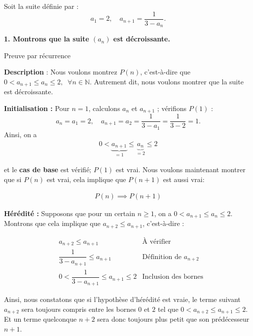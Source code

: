 \documentclass{report}
\begin{document}
Soit la suite définie par :
\[
a_1 = 2, \quad a_{n+1} = \frac{1}{3 - a_n}.
\]

\textbf{1. Montrons que la suite \((a_n)\) est décroissante.}

\vspace{1em}
\begin{center}
    Preuve par récurrence
\end{center}

\textbf{Description} : Nous voulons montrez $P(n)$, c'est-à-dire que 
$0 < a_{n+1} \leq a_n \leq 2, \;\; \forall n \in \mathbb{N}$. Autrement 
dit, nous voulons montrer que la suite est décroissante. 

\vspace{1em}


\textbf{Initialisation :} Pour \( n = 1 \), calculons \( a_n \) et \( a_{n+1} \) ; vérifions $P(1)$ :
\[
    a_n = a_1 = 2, \quad a_{n+1} = a_2 = \frac{1}{3 - a_1} = \frac{1}{3 - 2} = 1.
\]
Ainsi, on a  
\begin{align*}
    0 < \underbrace{a_{n+1}}_{= 1}  \leq \underbrace{a_n}_{= 2} \leq 2 
\end{align*}




et le \textbf{cas de base} est vérifié; $P(1)$ est vrai. Nous voulons maintenant montrer que si $P(n)$ est vrai, 
cela implique que $P(n+1)$ est aussi vrai:

\begin{align*}
    P(n) \implies P(n+1)
\end{align*}


\textbf{Hérédité :} Supposons que pour un certain \( n \geq 1 \), on a \( 0 < a_{n+1} \leq a_{n} \leq 2\).
Montrons que cela implique que \( a_{n+2} \leq a_{n+1} \), c'est-à-dire :

\begin{align*}
    &a_{n+2} \leq a_{n+1}  
    &\text{À vérifier} 
    \\ 
    &\dfrac{1}{3 - a_{n+1}} \leq a_{n+1} 
    &\text{Définition de } a_{n+2} 
    \\ 
    &0 < \dfrac{1}{3 - a_{n+1}} \leq a_{n+1} \leq 2  
    &\text{Inclusion des bornes}
\end{align*}    

Ainsi, nous constatons que si l'hypothèse d'hérédité  est vraie, le terme suivant 
$a_{n+2}$ sera toujours compris entre les bornes $0$ et $2$ tel que $0 < a_{n+2} 
\leq a_{n+1} \leq 2$. Et un terme quelconque $n+2$ sera donc toujours plus petit que 
son prédécesseur $n+1$. 
\end{document}
